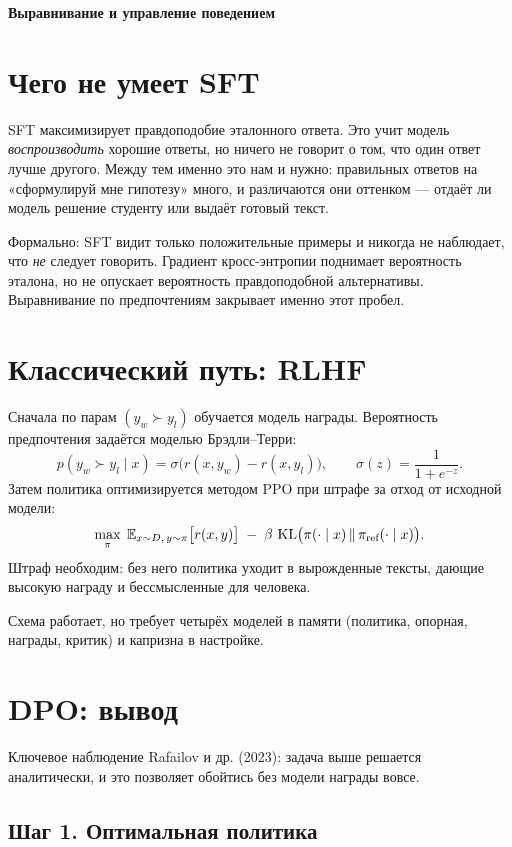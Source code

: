\documentclass[11pt,a4paper]{article}
\begin{document}
{\Large\bfseries Выравнивание и управление поведением}

\vspace{-0.5em}

\section{Чего не умеет SFT}

SFT максимизирует правдоподобие эталонного ответа. Это учит модель
\emph{воспроизводить} хорошие ответы, но ничего не говорит о том, что
один ответ лучше другого. Между тем именно это нам и нужно: правильных
ответов на «сформулируй мне гипотезу» много, и различаются они оттенком —
отдаёт ли модель решение студенту или выдаёт готовый текст.

Формально: SFT видит только положительные примеры и никогда
не наблюдает, что \emph{не} следует говорить. Градиент кросс-энтропии
поднимает вероятность эталона, но не опускает вероятность правдоподобной
альтернативы. Выравнивание по предпочтениям закрывает именно этот пробел.

\section{Классический путь: RLHF}

Сначала по парам $(y_w \succ y_l)$ обучается модель награды. Вероятность
предпочтения задаётся моделью Брэдли–Терри:
\[
p(y_w \succ y_l \mid x) = \sigma\big(r(x,y_w) - r(x,y_l)\big),
\qquad \sigma(z) = \frac{1}{1+e^{-z}} .
\]
Затем политика оптимизируется методом PPO при штрафе за отход
от исходной модели:
\[
\max_{\pi}\;
\mathbb{E}_{x\sim D,\,y\sim\pi}\big[r(x,y)\big]
\;-\;\beta\,\operatorname{KL}\!\big(\pi(\cdot\mid x)\,\|\,\pi_{\text{ref}}(\cdot\mid x)\big).
\]
Штраф необходим: без него политика уходит в вырожденные тексты, дающие
высокую награду и бессмысленные для человека.

Схема работает, но требует четырёх моделей в памяти (политика, опорная,
награды, критик) и капризна в настройке.

\section{DPO: вывод}

Ключевое наблюдение Rafailov и др. (2023): задача выше решается
аналитически, и это позволяет обойтись без модели награды вовсе.

\subsection{Шаг 1. Оптимальная политика}
\end{document}
